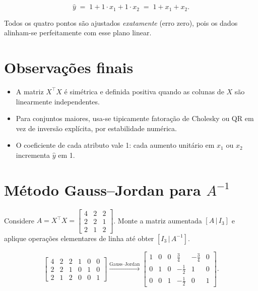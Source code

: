 \documentclass[12pt]{article}
\begin{document}
\[
\hat{y} \;=\; 1 + 1\cdot x_1 + 1\cdot x_2
\;=\; 1 + x_1 + x_2.
\]

Todos os quatro pontos são ajustados \emph{exatamente} (erro zero), pois os dados alinham-se perfeitamente com esse plano linear.

\section{Observações finais}

\begin{itemize}
  \item A matriz $X^{\!\top}X$ é simétrica e definida positiva quando as colunas de $X$ são linearmente independentes.
  \item Para conjuntos maiores, usa-se tipicamente fatoração de Cholesky ou QR em vez de inversão explícita, por estabilidade numérica.
  \item O coeficiente de cada atributo vale 1: cada aumento unitário em $x_1$ ou $x_2$ incrementa $\hat{y}$ em 1.
\end{itemize}


\section{Método Gauss--Jordan para $A^{-1}$}
Considere $A = X^{\!\top}X = \begin{bmatrix}4 & 2 & 2\\2 & 2 & 1\\2 & 1 & 2\end{bmatrix}$.  Monte a matriz aumentada $[A\,|\,I_3]$ e aplique operações elementares de linha até obter $[I_3\,|\,A^{-1}]$.

\[
\left[
\begin{array}{ccc|ccc}
4 & 2 & 2 & 1 & 0 & 0\\
2 & 2 & 1 & 0 & 1 & 0\\
2 & 1 & 2 & 0 & 0 & 1
\end{array}
\right]
\xrightarrow{\text{Gauss--Jordan}}
\left[
\begin{array}{ccc|ccc}
1 & 0 & 0 & \tfrac34 & -\tfrac34 & 0\\
0 & 1 & 0 & -\tfrac12 & 1 & 0\\
0 & 0 & 1 & -\tfrac12 & 0 & 1
\end{array}
\right].
\]
\end{document}
